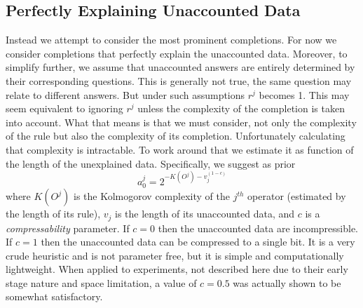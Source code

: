 \documentclass[runningheads]{llncs}
\begin{document}
\subsection{Perfectly Explaining Unaccounted Data}
Instead we attempt to consider the most prominent completions.  For
now we consider completions that perfectly explain the unaccounted
data. Moreover, to simplify further, we assume that unaccounted
answers are entirely determined by their corresponding questions. This
is generally not true, the same question may relate to different
answers. But under such assumptions $r^j$ becomes 1. This may seem
equivalent to ignoring $r^j$ unless the complexity of the completion
is taken into account. What that means is that we must consider, not
only the complexity of the rule but also the complexity of its
completion. Unfortunately calculating that complexity is
intractable. To work around that we estimate it as function of the
length of the unexplained data. Specifically, we suggest as prior
\begin{equation}
a^j_0 = 2^{-K(O^j) - v_j^{(1-c)}}
\end{equation}
where $K(O^j)$ is the Kolmogorov complexity of the $j^{th}$ operator
(estimated by the length of its rule), $v_j$ is the length of its
unaccounted data, and $c$ is a \emph{compressability} parameter. If
$c=0$ then the unaccounted data are incompressible. If $c=1$ then the
unaccounted data can be compressed to a single bit. It is a very crude
heuristic and is not parameter free, but it is simple and
computationally lightweight. When applied to experiments, not
described here due to their early stage nature and space limitation, a
value of $c=0.5$ was actually shown to be somewhat satisfactory.
\end{document}
